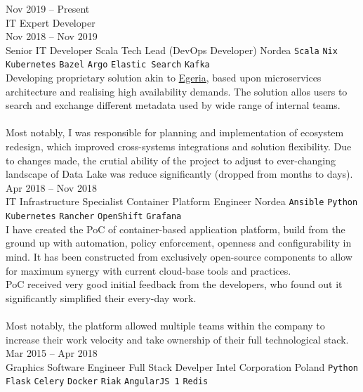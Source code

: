 \documentclass[9pt]{style/developercv}
\begin{document}
\begin{entrylist}
	\entry
		{Nov 2019 -- Present\\\footnotesize{IT Expert Developer}
		\\Nov 2018 -- Nov 2019\\\footnotesize{Senior IT Developer}}
		{Scala Tech Lead (DevOps Developer)}
		{Nordea}
		{
			\texttt{Scala}\slashsep
			\texttt{Nix}\slashsep
			\texttt{Kubernetes}\slashsep
			\texttt{Bazel}\slashsep
			\texttt{Argo}\slashsep
			\texttt{Elastic Search}\slashsep
			\texttt{Kafka}\\

			Developing proprietary solution akin to 
			\href{https://egeria.odpi.org}{Egeria}, based upon microservices 
			architecture and realising high availability demands. The solution
			allos users to search and exchange different metadata used by wide
			range of internal teams.\\ \\
			Most notably, I was responsible for planning and implementation of 
			ecosystem redesign, which improved cross-systems integrations and 
			solution flexibility. Due to changes made, the crutial ability of 
			the project to adjust to ever-changing landscape of Data Lake was
			reduce significantly (dropped from months to days). \\
		}
	\entry
		{Apr 2018 -- Nov 2018\\\footnotesize{IT Infrastructure Specialist}}
		{Container Platform Engineer}
		{Nordea}
		{
			\texttt{Ansible}\slashsep
			\texttt{Python}\slashsep
			\texttt{Kubernetes}\slashsep
			\texttt{Rancher}\slashsep
			\texttt{OpenShift}\slashsep
			\texttt{Grafana}\\

			I have created the PoC of container-based application platform, build 
			from the ground up with automation, policy enforcement, 
			openness and configurability in mind. 
			It has been constructed from exclusively open-source components to
			allow for maximum synergy with current cloud-base 
			tools and practices. \\
			PoC received very good initial feedback from the developers, 
			who found out it significantly simplified their every-day work.\\ \\
			Most notably, the platform allowed multiple teams within the company
			to increase their work velocity and take ownership of their full technological
			stack.
		}
	\entry
		{Mar 2015 -- Apr 2018\\\footnotesize{Graphics Software Engineer}}
		{Full Stack Develper}
		{Intel Corporation Poland}
		{
			\texttt{Python}\slashsep
			\texttt{Flask}\slashsep
			\texttt{Celery}\slashsep
			\texttt{Docker}\slashsep
			\texttt{Riak}\slashsep
			\texttt{AngularJS 1}\slashsep
			\texttt{Redis}\\

}
\end{entrylist}
\end{document}
